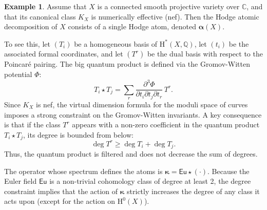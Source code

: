\documentclass[12pt,a4paper]{amsart}
\theoremstyle{definition}
\newtheorem{example}[theorem]{Example}
\theoremstyle{remark}
\begin{document}
\begin{example}
\label{ex:nef}
    Assume that \( X \) is a connected smooth projective variety over \( \mathbb{C} \), and that its canonical class \( K_X \) is numerically effective (nef). Then the Hodge atomic decomposition of \( X \) consists of a single Hodge atom, denoted \( \boldsymbol\alpha(X) \).

To see this, let \( (T_i) \) be a homogeneous basis of \(\mathrm{H}^\ast(X, \mathbb{Q}) \), let \( (t_i) \) be the associated formal coordinates, and let \( (T^r) \) be the dual basis with respect to the Poincaré pairing. The big quantum product is defined via the Gromov-Witten potential $\Phi$:
\[
T_i \star T_j = \sum_r \frac{\partial^3 \Phi}{\partial t_i \partial t_j \partial t_r} \, T^r.
\]
Since \( K_X \) is nef, the virtual dimension formula for the moduli space of curves imposes a strong constraint on the Gromov-Witten invariants. A key consequence is that if the class \( T^r \) appears with a non-zero coefficient in the quantum product \( T_i \star T_j \), its degree is bounded from below:
\[
\deg T^r \geq \deg T_i + \deg T_j.
\]
Thus, the quantum product is filtered and does not decrease the sum of degrees.

The operator whose spectrum defines the atoms is $\boldsymbol{\kappa} = \mathsf{Eu} \star (\cdot)$. Because the Euler field $\mathsf{Eu}$ is a non-trivial cohomology class of degree at least 2, the degree constraint implies that the action of $\boldsymbol{\kappa}$ strictly increases the degree of any class it acts upon (except for the action on $\mathrm{H}^0(X)$).
\end{example}

\ 
\end{document}
